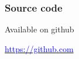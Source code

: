 
\begin{frame}
    \frametitle{Source code}

    Available on github \\

    \vspace{1cm}

    \href{https://github.com}{\textcolor{blue}{https://github.com}}

\end{frame}
